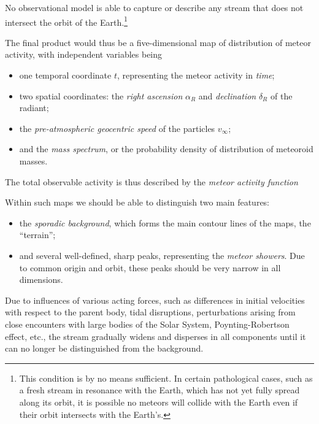     No observational model is able to capture or describe any stream that does not intersect the orbit of the
    Earth.\footnote{This condition is by no means sufficient. In certain pathological cases, such as a fresh stream in resonance
    with the Earth, which has not yet fully spread along its orbit, it is possible no meteors will collide with the Earth even
    if their orbit intersects with the Earth's.}


    The final product would thus be a five-dimensional map of distribution of meteor activity, with independent variables being
    \begin{itemize}
        \item one temporal coordinate $t$, representing the meteor activity in \emph{time};
        \item two spatial coordinates: the \emph{right ascension} $\alpha_R$ and \emph{declination} $\delta_R$ of the radiant;
        \item the \emph{pre-atmospheric geocentric speed} of the particles $v_\infty$;
        \item and the \emph{mass spectrum}, or the probability density of distribution of meteoroid masses.
    \end{itemize}

    The total observable activity is thus described by the \emph{meteor activity function}

  
    Within such maps we should be able to distinguish two main features:
    \begin{itemize}
        \item the \emph{sporadic background}, which forms the main contour lines of the maps, the ``terrain'';
        \item and several well-defined, sharp peaks, representing the \emph{meteor showers}.
            Due to common origin and orbit, these peaks should be very narrow in all dimensions.
    \end{itemize}

    Due to influences of various acting forces, such as differences
    in initial velocities with respect to the parent body, tidal disruptions,
    perturbations arising from close encounters with large bodies of the Solar System,
    Poynting-Robertson effect, etc., the stream
    gradually widens and disperses in all components until it can no longer be distinguished from the background.

